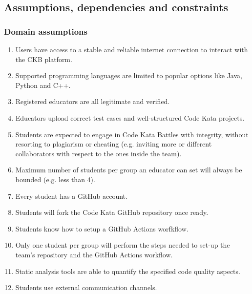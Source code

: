 \subsection{Assumptions, dependencies and constraints}
\subsubsection{Domain assumptions}
\begin{enumerate}[label=$\bullet$ \textbf{D\arabic*:}]
    \item Users have access to a stable and reliable internet connection to interact with the CKB platform.
    \item Supported programming languages are limited to popular options like Java, Python and C++.
    \item Registered educators are all legitimate and verified.
    \item Educators upload correct test cases and well-structured Code Kata projects.
    \item Students are expected to engage in Code Kata Battles with integrity, without resorting to plagiarism or cheating (e.g. inviting more or different collaborators with respect to the ones inside the team).
    \item Maximum number of students per group an educator can set will always be bounded (e.g. less than 4).
    \item Every student has a GitHub account.
    \item Students will fork the Code Kata GitHub repository once ready.
    \item Students know how to setup a GitHub Actions worfkflow.
    \item Only one student per group will perform the steps needed to set-up the team's repository and the GitHub Actions workflow.
    \item Static analysis tools are able to quantify the specified code quality aspects.
    \item Students use external communication channels.
\end{enumerate}